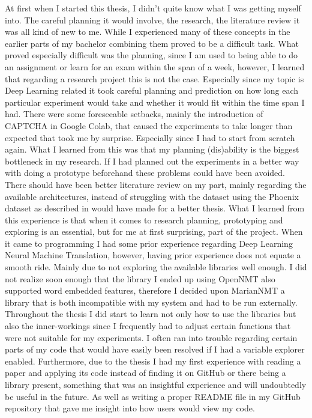 At first when I started this thesis, I didn't quite know what I was getting myself into. The careful planning it would involve, the research, the literature review it was all kind of new to me. While I experienced many of these concepts in the earlier parts of my bachelor combining them proved to be a difficult task. What proved especially difficult was the planning, since I am used to being able to do an assignment or learn for an exam within the span of a week, however, I learned that regarding a research project this is not the case. Especially since my topic is Deep Learning related it took careful planning and prediction on how long each particular experiment would take and whether it would fit within the time span I had. There were some foreseeable setbacks, mainly the introduction of CAPTCHA in Google Colab, that caused the experiments to take longer than expected that took me by surprise. Especially since I had to start from scratch again. What I learned from this was that my planning (dis)ability is the biggest bottleneck in my research. If I had planned out the experiments in a better way with doing a prototype beforehand these problems could have been avoided. There should have been better literature review on my part, mainly regarding the available architectures, instead of struggling with the dataset using the Phoenix dataset as described in \cite{camgoz2018neural} would have made for a better thesis. What I learned from this experience is that when it comes to research planning, prototyping and exploring is an essential, but for me at first surprising, part of the project.
When it came to programming I had some prior experience regarding Deep Learning Neural Machine Translation, however, having prior experience does not equate a smooth ride. Mainly due to not exploring the available libraries well enough. I did not realize soon enough that the library I ended up using OpenNMT \cite{klein-etal-2017-opennmt} also supported word embedded features, therefore I decided upon MarianNMT \cite{mariannmt} a library that is both incompatible with my system and had to be run externally. Throughout the thesis I did start to learn not only how to use the libraries but also the inner-workings since I frequently had to adjust certain functions that were not suitable for my experiments. I often ran into trouble regarding certain parts of my code that would have easily been resolved if I had a variable explorer enabled. Furthermore, due to the thesis I had my first experience with reading a paper and applying its code instead of finding it on GitHub or there being a library present, something that was an insightful experience and will undoubtedly be useful in the future. As well as writing a proper README file in my GitHub repository \cite{gijsgithub} that gave me insight into how users would view my code.
